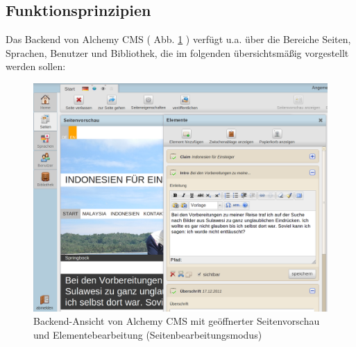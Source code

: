 \subsection{Funktionsprinzipien}
Das Backend von Alchemy CMS ( Abb. \ref{alchemybackend} ) verfügt u.a. über die Bereiche Seiten, Sprachen, Benutzer und Bibliothek, die im folgenden übersichtsmäßig vorgestellt werden sollen:
\begin{figure}[!h]
\begin{center}
\includegraphics[scale=0.4]{images/analyse/alchemy/inhalte.png}
\caption{Backend-Ansicht von Alchemy CMS mit geöffnerter Seitenvorschau und Elementebearbeitung (Seitenbearbeitungsmodus)}
\label{alchemybackend}
\end{center}
\end{figure}

